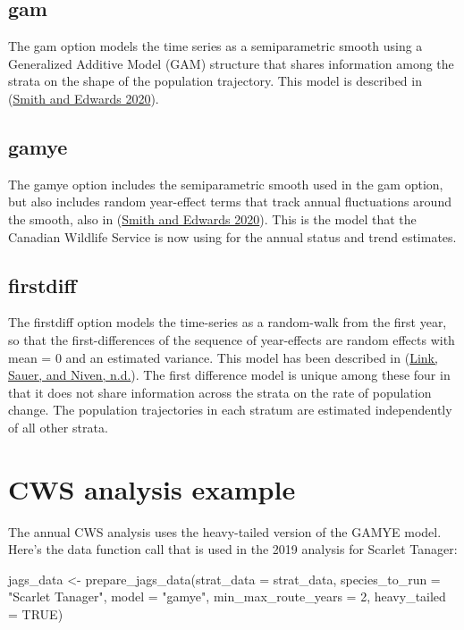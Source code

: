 \documentclass[
]{book}
\newenvironment{Shaded}{\begin{snugshade}}{\end{snugshade}}
\newcommand{\AttributeTok}[1]{\textcolor[rgb]{0.77,0.63,0.00}{#1}}
\newcommand{\ConstantTok}[1]{\textcolor[rgb]{0.00,0.00,0.00}{#1}}
\newcommand{\DecValTok}[1]{\textcolor[rgb]{0.00,0.00,0.81}{#1}}
\newcommand{\FunctionTok}[1]{\textcolor[rgb]{0.00,0.00,0.00}{#1}}
\newcommand{\NormalTok}[1]{#1}
\newcommand{\OtherTok}[1]{\textcolor[rgb]{0.56,0.35,0.01}{#1}}
\newcommand{\StringTok}[1]{\textcolor[rgb]{0.31,0.60,0.02}{#1}}
\begin{document}
\hypertarget{gam}{%
\subsection{gam}\label{gam}}

The gam option models the time series as a semiparametric smooth using a Generalized Additive Model (GAM) structure that shares information among the strata on the shape of the population trajectory. This model is described in (\protect\hyperlink{ref-smith2020a}{Smith and Edwards 2020}).

\hypertarget{gamye}{%
\subsection{gamye}\label{gamye}}

The gamye option includes the semiparametric smooth used in the gam option, but also includes random year-effect terms that track annual fluctuations around the smooth, also in (\protect\hyperlink{ref-smith2020a}{Smith and Edwards 2020}). This is the model that the Canadian Wildlife Service is now using for the annual status and trend estimates.

\hypertarget{firstdiff}{%
\subsection{firstdiff}\label{firstdiff}}

The firstdiff option models the time-series as a random-walk from the first year, so that the first-differences of the sequence of year-effects are random effects with mean = 0 and an estimated variance. This model has been described in (\protect\hyperlink{ref-link}{Link, Sauer, and Niven, n.d.}). The first difference model is unique among these four in that it does not share information across the strata on the rate of population change. The population trajectories in each stratum are estimated independently of all other strata.

\hypertarget{cws-analysis-example}{%
\section{CWS analysis example}\label{cws-analysis-example}}

The annual CWS analysis uses the heavy-tailed version of the GAMYE model. Here's the data function call that is used in the 2019 analysis for Scarlet Tanager:

\begin{Shaded}
\begin{Highlighting}[]
\NormalTok{jags\_data }\OtherTok{\textless{}{-}} \FunctionTok{prepare\_jags\_data}\NormalTok{(}\AttributeTok{strat\_data =}\NormalTok{ strat\_data,}
                  \AttributeTok{species\_to\_run =} \StringTok{"Scarlet Tanager"}\NormalTok{,}
                  \AttributeTok{model =} \StringTok{"gamye"}\NormalTok{,}
                  \AttributeTok{min\_max\_route\_years =} \DecValTok{2}\NormalTok{,}
                  \AttributeTok{heavy\_tailed =} \ConstantTok{TRUE}\NormalTok{)}
\end{Highlighting}
\end{Shaded}
\end{document}
